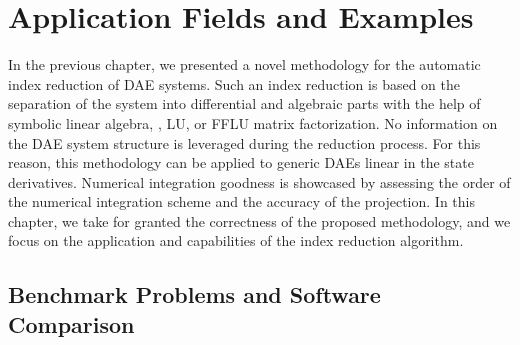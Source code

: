 
\chapter{Application Fields and Examples}
\label{chap5:applications}

In the previous chapter, we presented a novel methodology for the automatic index reduction of \ac{DAE} systems. Such an index reduction is based on the separation of the system into differential and algebraic parts with the help of symbolic linear algebra, \ie{}, \ac{LU}, or \ac{FFLU} matrix factorization. No information on the \ac{DAE} system structure is leveraged during the reduction process. For this reason, this methodology can be applied to generic \acp{DAE} linear in the state derivatives. Numerical integration goodness is showcased by assessing the order of the numerical integration scheme and the accuracy of the projection. In this chapter, we take for granted the correctness of the proposed methodology, and we focus on the application and capabilities of the index reduction algorithm.

\section{Benchmark Problems and Software Comparison}

